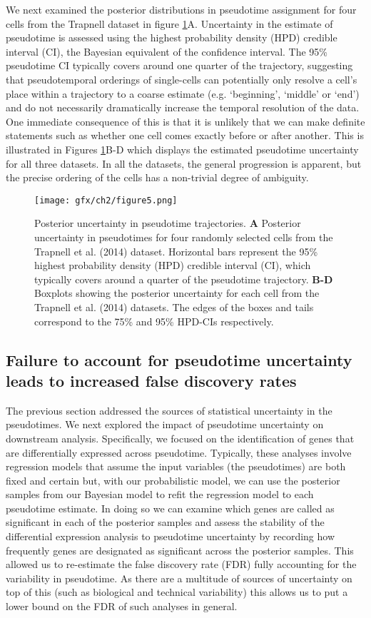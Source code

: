 We next examined the posterior distributions in pseudotime assignment for four cells from the Trapnell dataset in figure \ref{fig:posuncert}A. Uncertainty in the estimate of pseudotime is assessed using the highest probability density (HPD) credible interval (CI), the Bayesian equivalent of the confidence interval. The 95\% pseudotime CI typically covers around one quarter of the trajectory, suggesting that pseudotemporal orderings of single-cells can potentially only resolve a cell's place within a trajectory to a coarse estimate (e.g. `beginning', `middle' or `end') and do not necessarily dramatically increase the temporal resolution of the data. One immediate consequence of this is that it is unlikely that we can make definite statements such as whether one cell comes exactly before or after another. This is illustrated in Figures \ref{fig:posuncert}B-D which displays the estimated pseudotime uncertainty for all three datasets. In all the datasets, the general progression is apparent, but the precise ordering of the cells has a non-trivial degree of ambiguity.

\begin{figure}
\centering
	\texttt{[image: gfx/ch2/figure5.png]}
    \caption{ Posterior uncertainty in pseudotime trajectories.  \textbf{A} Posterior uncertainty in pseudotimes for four randomly selected cells from the Trapnell et al. (2014) dataset. Horizontal bars represent the 95\% highest probability density (HPD) credible interval (CI), which typically covers around a quarter of the pseudotime trajectory. \textbf{B-D} Boxplots showing the posterior uncertainty for each cell from the Trapnell et al. (2014) datasets. The edges of the boxes and tails correspond to the 75\% and 95\% HPD-CIs respectively.} \label{fig:posuncert}
\end{figure}


\subsection{Failure to account for pseudotime uncertainty leads to increased false discovery rates}

The previous section addressed the sources of statistical uncertainty in the pseudotimes. We next explored the impact of pseudotime uncertainty on downstream analysis. Specifically, we focused on the identification of genes that are differentially expressed across pseudotime. Typically, these analyses involve regression models that assume the input variables (the pseudotimes) are both fixed and certain but, with our probabilistic model, we can use the posterior samples from our Bayesian model to refit the regression model to each pseudotime estimate. In doing so we can examine which genes are called as significant in each of the posterior samples and assess the stability of the differential expression analysis to pseudotime uncertainty by recording how frequently genes are designated as significant across the posterior samples. This allowed us to re-estimate the false discovery rate (FDR)  fully accounting for the variability in pseudotime. As there are a multitude of sources of uncertainty on top of this (such as biological and technical variability) this allows us to put a lower bound on the FDR of such analyses in general.

